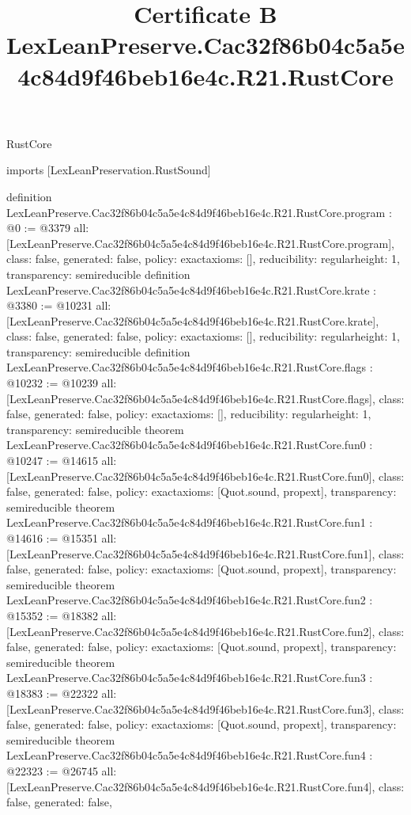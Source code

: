 \begin{lexlean}{RustCore}
\title{Certificate B LexLeanPreserve.Cac32f86b04c5a5e4c84d9f46beb16e4c.R21.RustCore}
\begin{coremodule}
imports [LexLeanPreservation.RustSound]

definition LexLeanPreserve.Cac32f86b04c5a5e4c84d9f46beb16e4c.R21.RustCore.program : @0 := @3379 {
  all: [LexLeanPreserve.Cac32f86b04c5a5e4c84d9f46beb16e4c.R21.RustCore.program],
  class: false,
  generated: false,
  policy: exact{axioms: []},
  reducibility: regular{height: 1},
  transparency: semireducible
}
definition LexLeanPreserve.Cac32f86b04c5a5e4c84d9f46beb16e4c.R21.RustCore.krate : @3380 := @10231 {
  all: [LexLeanPreserve.Cac32f86b04c5a5e4c84d9f46beb16e4c.R21.RustCore.krate],
  class: false,
  generated: false,
  policy: exact{axioms: []},
  reducibility: regular{height: 1},
  transparency: semireducible
}
definition LexLeanPreserve.Cac32f86b04c5a5e4c84d9f46beb16e4c.R21.RustCore.flags : @10232 := @10239 {
  all: [LexLeanPreserve.Cac32f86b04c5a5e4c84d9f46beb16e4c.R21.RustCore.flags],
  class: false,
  generated: false,
  policy: exact{axioms: []},
  reducibility: regular{height: 1},
  transparency: semireducible
}
theorem LexLeanPreserve.Cac32f86b04c5a5e4c84d9f46beb16e4c.R21.RustCore.fun0 : @10247 := @14615 {
  all: [LexLeanPreserve.Cac32f86b04c5a5e4c84d9f46beb16e4c.R21.RustCore.fun0],
  class: false,
  generated: false,
  policy: exact{axioms: [Quot.sound, propext]},
  transparency: semireducible
}
theorem LexLeanPreserve.Cac32f86b04c5a5e4c84d9f46beb16e4c.R21.RustCore.fun1 : @14616 := @15351 {
  all: [LexLeanPreserve.Cac32f86b04c5a5e4c84d9f46beb16e4c.R21.RustCore.fun1],
  class: false,
  generated: false,
  policy: exact{axioms: [Quot.sound, propext]},
  transparency: semireducible
}
theorem LexLeanPreserve.Cac32f86b04c5a5e4c84d9f46beb16e4c.R21.RustCore.fun2 : @15352 := @18382 {
  all: [LexLeanPreserve.Cac32f86b04c5a5e4c84d9f46beb16e4c.R21.RustCore.fun2],
  class: false,
  generated: false,
  policy: exact{axioms: [Quot.sound, propext]},
  transparency: semireducible
}
theorem LexLeanPreserve.Cac32f86b04c5a5e4c84d9f46beb16e4c.R21.RustCore.fun3 : @18383 := @22322 {
  all: [LexLeanPreserve.Cac32f86b04c5a5e4c84d9f46beb16e4c.R21.RustCore.fun3],
  class: false,
  generated: false,
  policy: exact{axioms: [Quot.sound, propext]},
  transparency: semireducible
}
theorem LexLeanPreserve.Cac32f86b04c5a5e4c84d9f46beb16e4c.R21.RustCore.fun4 : @22323 := @26745 {
  all: [LexLeanPreserve.Cac32f86b04c5a5e4c84d9f46beb16e4c.R21.RustCore.fun4],
  class: false,
  generated: false,
}
\end{coremodule}
\end{lexlean}
